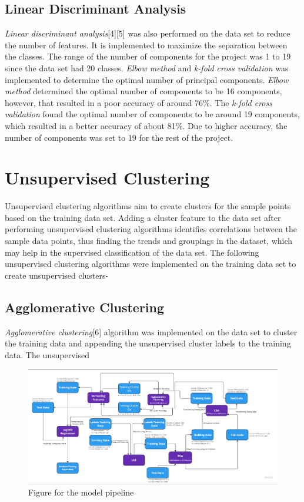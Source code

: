 \documentclass[conference]{IEEEtran}
\begin{document}
\subsection{Linear Discriminant Analysis}
    \textit{Linear discriminant analysis}[4][5] was also performed on the data set to reduce the number of features. It is implemented to maximize the separation between the classes. The range of the number of components for the project was 1 to 19 since the data set had 20 classes. \textit{Elbow method} and \textit{k-fold cross validation} was implemented to determine the optimal number of principal components. \textit{Elbow method} determined the optimal number of components to be 16 components, however, that resulted in a poor accuracy of around 76\%. 
    The \textit{k-fold cross validation} found the optimal number of components to be around 19 components, which resulted in a better accuracy of about 81\%.
    Due to higher accuracy, the number of components was set to 19 for the rest of the project.

\section{Unsupervised Clustering}
    Unsupervised clustering algorithms aim to create clusters for the sample points based on the training data set. Adding a cluster feature to the data set after performing unsupervised clustering algorithms identifies correlations between the sample data points, thus finding the trends and groupings in the dataset, which may help in the supervised classification of the data set. The following unsupervised clustering algorithms were implemented on the training data set to create unsupervised clusters- 
\subsection{Agglomerative Clustering}
    \textit{Agglomerative clustering}[6] algorithm was implemented on the data set to cluster the training data and appending the unsupervised cluster labels to the training data. The unsupervised
    
    \begin{figure}[htbp]
        \centerline{\includegraphics[width=1\columnwidth]{img.png}}
        \caption{Figure for the model pipeline}
        \label{fig}
        \end{figure}
            
\end{document}

